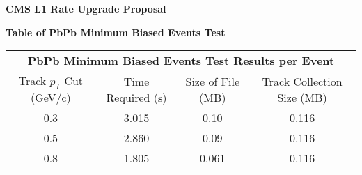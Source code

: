 \documentclass[12pt,oneside,reqno]{amsart}
\begin{document}
\renewcommand{\arraystretch}{1.5}

    \begin{center}{
   \Large \textbf {CMS L1 Rate Upgrade Proposal}
   
   \vspace{0.5cm} \large \textbf{Table of PbPb Minimum Biased Events Test}
   
   
     }
\end{center}

\vspace{1cm} \begin{center}
\begin{tabular}{ |c|c|c|c|} 

\cline{1-4}
\multicolumn{4}{|c|}{\textbf{PbPb Minimum Biased Events Test Results per Event} }\\
 \cline{1-4}
 Track $p_T$ Cut (GeV/c)    & Time Required (s)  & Size of File (MB)  & Track Collection Size (MB) \\
\cline{1-4}
 0.3 & 3.015 & 0.10 & 0.116 \\
\hline
 0.5 & 2.860 & 0.09 & 0.116 \\
\hline
 0.8 & 1.805 & 0.061 & 0.116 \\
\hline

\end{tabular}
\end{center}
\end{document}
